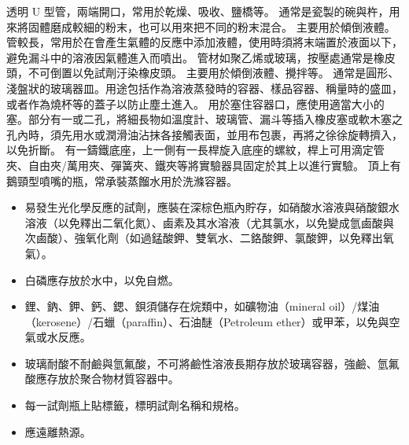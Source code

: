 \documentclass[a4paper,12pt]{article}
\begin{document}
透明 U 型管，兩端開口，常用於乾燥、吸收、鹽橋等。
通常是瓷製的碗與杵，用來將固體磨成較細的粉末，也可以用來把不同的粉末混合。
主要用於傾倒液體。
管較長，常用於在會產生氣體的反應中添加液體，使用時須將末端置於液面以下，避免漏斗中的溶液因氣體進入而噴出。
管材如聚乙烯或玻璃，按壓處通常是橡皮頭，不可倒置以免試劑汙染橡皮頭。
主要用於傾倒液體、攪拌等。
通常是圓形、淺盤狀的玻璃器皿。用途包括作為溶液蒸發時的容器、樣品容器、稱量時的盛皿，或者作為燒杯等的蓋子以防止塵土進入。
用於塞住容器口，應使用適當大小的塞。部分有一或二孔，將細長物如溫度計、玻璃管、漏斗等插入橡皮塞或軟木塞之孔內時，須先用水或潤滑油沾抹各接觸表面，並用布包裹，再將之徐徐旋轉擠入，以免折斷。
有一鑄鐵底座，上一側有一長桿旋入底座的螺紋，桿上可用滴定管夾、自由夾/萬用夾、彈簧夾、鐵夾等將實驗器具固定於其上以進行實驗。
頂上有鵝頸型噴嘴的瓶，常承裝蒸餾水用於洗滌容器。
\begin{itemize}
\item 易發生光化學反應的試劑，應裝在深棕色瓶內貯存，如硝酸水溶液與硝酸銀水溶液（以免釋出二氧化氮）、鹵素及其水溶液（尤其氯水，以免變成氫鹵酸與次鹵酸）、強氧化劑（如過錳酸鉀、雙氧水、二鉻酸鉀、氯酸鉀，以免釋出氧氣）。
\item 白磷應存放於水中，以免自燃。
\item 鋰、鈉、鉀、鈣、鍶、鋇須儲存在烷類中，如礦物油（mineral oil）/煤油（kerosene）/石蠟（paraffin）、石油醚（Petroleum ether）或甲苯，以免與空氣或水反應。
\item 玻璃耐酸不耐鹼與氫氟酸，不可將鹼性溶液長期存放於玻璃容器，強鹼、氫氟酸應存放於聚合物材質容器中。
\item 每一試劑瓶上貼標籤，標明試劑名稱和規格。
\item 應遠離熱源。
\end{itemize}
\end{document}
